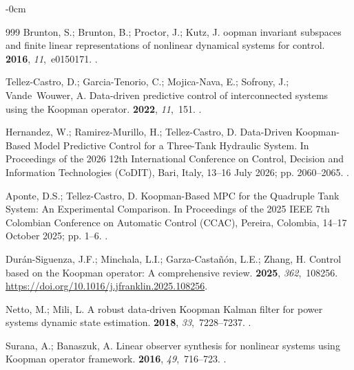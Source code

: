 \documentclass[asi,article,accept,pdftex,moreauthors]{Definitions/mdpi}
\begin{document}
\begin{adjustwidth}{-\extralength}{0cm}
\begin{thebibliography}{999}
Brunton, S.; Brunton, B.; Proctor, J.; Kutz, J.
oopman invariant subspaces and finite linear representations of
  nonlinear dynamical systems for control.
 {\bf 2016}, {\em 11},~e0150171.
.

Tellez-Castro, D.; Garcia-Tenorio, C.; Mojica-Nava, E.; Sofrony, J.;
  Vande~Wouwer, A.
\newblock Data-driven predictive control of interconnected systems using the
  {K}oopman operator.
 {\bf 2022}, {\em 11},~151.
.

Hernandez, W.; Ramirez-Murillo, H.; Tellez-Castro, D.
\newblock Data-Driven Koopman-Based Model Predictive Control for a Three-Tank
  Hydraulic System.
\newblock In Proceedings of the 2026 12th International Conference on Control,
  Decision and Information Technologies (CoDIT), Bari, Italy, 13--16 July 2026; pp. 2060--2065.
.

Aponte, D.S.; Tellez-Castro, D.
\newblock Koopman-Based MPC for the Quadruple Tank System: An Experimental
  Comparison.
\newblock In Proceedings of the 2025 IEEE 7th Colombian Conference on Automatic
  Control (CCAC), Pereira, Colombia, 14--17 October 2025; pp. 1--6.
.

Durán-Siguenza, J.F.; Minchala, L.I.; Garza-Castañón, L.E.; Zhang, H.
\newblock Control based on the Koopman operator: A comprehensive review.
 {\bf 2025}, {\em
  362},~108256.
\newblock
  {\url{https://doi.org/10.1016/j.jfranklin.2025.108256}}.

Netto, M.; Mili, L.
\newblock A robust data-driven {K}oopman {K}alman filter for power systems dynamic state estimation.
 {\bf 2018}, {\em 33},~7228--7237.
.

Surana, A.; Banaszuk, A.
\newblock Linear observer synthesis for nonlinear systems using {K}oopman
  operator framework.
 {\bf 2016}, {\em 49},~716--723.
.


\end{thebibliography}
\end{adjustwidth}
\end{document}
